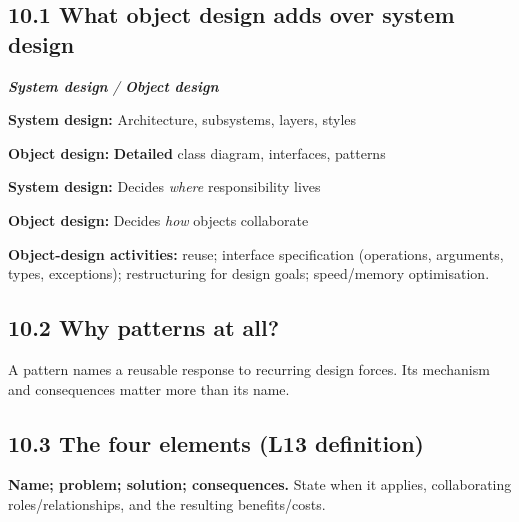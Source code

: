 \begin{studycolumns}
\vspace{0pt}

\subsection*{10.1 What object design adds over system design}
\begin{referenceentries}
\textit{\textbf{System design} / \textbf{Object design}}\par\smallskip
\noindent \textbf{System design:} Architecture, subsystems, layers, styles\par
\noindent \textbf{Object design:} \textbf{Detailed} class diagram, interfaces, patterns\par\smallskip
\noindent \textbf{System design:} Decides \emph{where} responsibility lives\par
\noindent \textbf{Object design:} Decides \emph{how} objects collaborate\par\smallskip
\end{referenceentries}\textbf{Object-design activities:} reuse; interface specification (operations, arguments, types, exceptions); restructuring for design goals; speed/\allowbreak{}memory optimisation.
\subsection*{10.2 Why patterns at all?}
A pattern names a reusable response to recurring design forces. Its mechanism and consequences matter more than its name.
\subsection*{10.3 The four elements (L13 definition)}
\textbf{Name; problem; solution; consequences.} State when it applies, collaborating roles/\allowbreak{}relationships, and the resulting benefits/\allowbreak{}costs.

\end{studycolumns}
